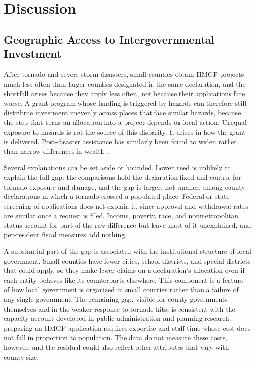 \section{Discussion}
\label{sec:discussion}

\subsection{Geographic Access to Intergovernmental Investment}

After tornado and severe-storm disasters, small counties obtain HMGP projects much less often than larger counties designated in the same declaration, and the shortfall arises because they apply less often, not because their applications fare worse. A grant program whose funding is triggered by hazards can therefore still distribute investment unevenly across places that face similar hazards, because the step that turns an allocation into a project depends on local action. Unequal exposure to hazards is not the source of this disparity. It arises in how the grant is delivered. Post-disaster assistance has similarly been found to widen rather than narrow differences in wealth \parencite{howell2019damages}.

Several explanations can be set aside or bounded. Lower need is unlikely to explain the full gap: the comparisons hold the declaration fixed and control for tornado exposure and damage, and the gap is larger, not smaller, among county--declarations in which a tornado crossed a populated place. Federal or state screening of applications does not explain it, since approval and withdrawal rates are similar once a request is filed. Income, poverty, race, and nonmetropolitan status account for part of the raw difference but leave most of it unexplained, and per-resident fiscal measures add nothing.

A substantial part of the gap is associated with the institutional structure of local government. Small counties have fewer cities, school districts, and special districts that could apply, so they make fewer claims on a declaration's allocation even if each entity behaves like its counterparts elsewhere. This component is a feature of how local government is organized in small counties rather than a failure of any single government. The remaining gap, visible for county governments themselves and in the weaker response to tornado hits, is consistent with the capacity account developed in public administration and planning research \parencite{collins2006redistributive,hall2008grant,lyles2014planners,smith2025rural}: preparing an HMGP application requires expertise and staff time whose cost does not fall in proportion to population. The data do not measure these costs, however, and the residual could also reflect other attributes that vary with county size.


